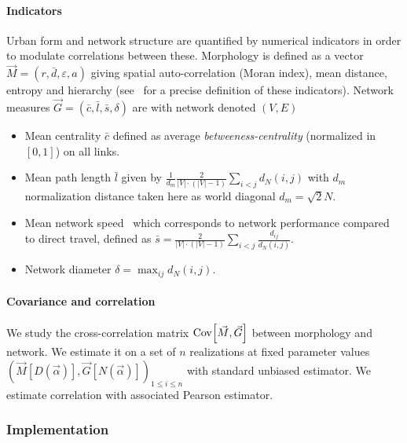 \paragraph{Indicators}

Urban form and network structure are quantified by numerical indicators in order to modulate correlations between these. Morphology is defined as a vector $\vec{M}=(r,\bar{d},\varepsilon,a)$ giving spatial auto-correlation (Moran index), mean distance, entropy and hierarchy (see~\cite{le2015forme} for a precise definition of these indicators). Network measures $\vec{G} = (\bar{c},\bar{l},\bar{s},\delta)$ are with network denoted $(V,E)$
\begin{itemize}
\item Mean centrality $\bar{c}$ defined as average \emph{betweeness-centrality} (normalized in $[0,1]$) on all links.
\item Mean path length $\bar{l}$ given by $\frac{1}{d_m}\frac{2}{|V|\cdot (|V|-1)}\sum_{i<j}d_N(i,j)$ with $d_m$ normalization distance taken here as world diagonal $d_m=\sqrt{2}N$.
\item Mean network speed~\cite{banos2012towards} which corresponds to network performance compared to direct travel, defined as $\bar{s} = \frac{2}{|V|\cdot (|V|-1)}\sum_{i<j}{\frac{d_{ij}}{d_N(i,j)}}$.
\item Network diameter $\delta = \max_{ij}d_N(i,j)$.
\end{itemize}




\paragraph{Covariance and correlation}

We study the cross-correlation matrix $\operatorname{Cov}\!\left[\vec{M},\vec{G}\right]$ between morphology and network. We estimate it on a set of $n$ realizations at fixed parameter values $(\vec{M}\left[D(\vec{\alpha})\right],\vec{G}\left[N(\vec{\alpha})\right])_{1\leq i\leq n}$ with standard unbiased estimator. We estimate correlation with associated Pearson estimator. 



\subsubsection{Implementation}


